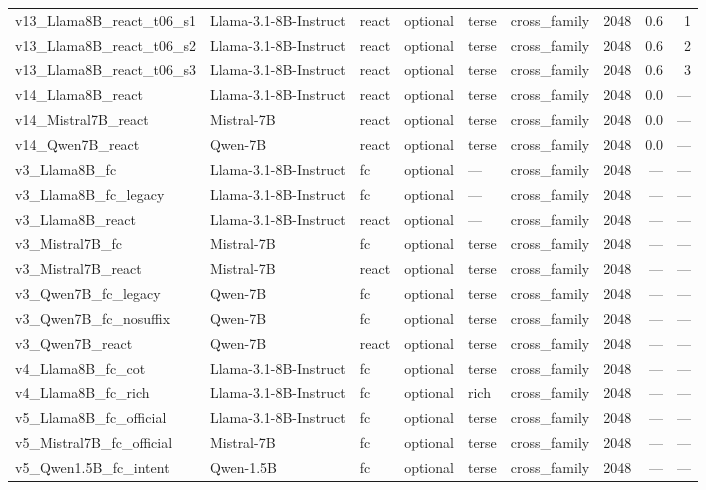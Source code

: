 {\begin{longtable}[]{@{}llllllrrr@{}}
v13\_Llama8B\_react\_t06\_s1 & Llama-3.1-8B-Instruct & react & optional & terse & cross\_family & 2048 & 0.6 & 1 \\
v13\_Llama8B\_react\_t06\_s2 & Llama-3.1-8B-Instruct & react & optional & terse & cross\_family & 2048 & 0.6 & 2 \\
v13\_Llama8B\_react\_t06\_s3 & Llama-3.1-8B-Instruct & react & optional & terse & cross\_family & 2048 & 0.6 & 3 \\
v14\_Llama8B\_react & Llama-3.1-8B-Instruct & react & optional & terse & cross\_family & 2048 & 0.0 & --- \\
v14\_Mistral7B\_react & Mistral-7B & react & optional & terse & cross\_family & 2048 & 0.0 & --- \\
v14\_Qwen7B\_react & Qwen-7B & react & optional & terse & cross\_family & 2048 & 0.0 & --- \\
v3\_Llama8B\_fc & Llama-3.1-8B-Instruct & fc & optional & --- & cross\_family & 2048 & --- & --- \\
v3\_Llama8B\_fc\_legacy & Llama-3.1-8B-Instruct & fc & optional & --- & cross\_family & 2048 & --- & --- \\
v3\_Llama8B\_react & Llama-3.1-8B-Instruct & react & optional & --- & cross\_family & 2048 & --- & --- \\
v3\_Mistral7B\_fc & Mistral-7B & fc & optional & terse & cross\_family & 2048 & --- & --- \\
v3\_Mistral7B\_react & Mistral-7B & react & optional & terse & cross\_family & 2048 & --- & --- \\
v3\_Qwen7B\_fc\_legacy & Qwen-7B & fc & optional & terse & cross\_family & 2048 & --- & --- \\
v3\_Qwen7B\_fc\_nosuffix & Qwen-7B & fc & optional & terse & cross\_family & 2048 & --- & --- \\
v3\_Qwen7B\_react & Qwen-7B & react & optional & terse & cross\_family & 2048 & --- & --- \\
v4\_Llama8B\_fc\_cot & Llama-3.1-8B-Instruct & fc & optional & terse & cross\_family & 2048 & --- & --- \\
v4\_Llama8B\_fc\_rich & Llama-3.1-8B-Instruct & fc & optional & rich & cross\_family & 2048 & --- & --- \\
v5\_Llama8B\_fc\_official & Llama-3.1-8B-Instruct & fc & optional & terse & cross\_family & 2048 & --- & --- \\
v5\_Mistral7B\_fc\_official & Mistral-7B & fc & optional & terse & cross\_family & 2048 & --- & --- \\
v5\_Qwen1.5B\_fc\_intent & Qwen-1.5B & fc & optional & terse & cross\_family & 2048 & --- & --- \\

\end{longtable}}
